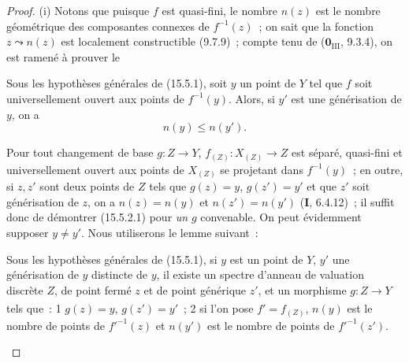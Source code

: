 \begin{proof}
(i) Notons que puisque $f$ est quasi-fini, le nombre $n(z)$ est le nombre géométrique des composantes connexes de $f^{-1}(z)$~; on sait que la fonction $z\leadsto n(z)$ est localement constructible (9.7.9)~; compte tenu de ($\mathbf{0}_{\mathrm{III}}$, 9.3.4), on est ramené à prouver le

\begin{corollary}[15.5.2]
Sous les hypothèses générales de \textup{(15.5.1)}, soit $y$ un point de $Y$ tel que $f$ soit universellement ouvert aux points de $f^{-1}(y)$. Alors, si $y'$ est une générisation de $y$, on a
\begin{equation}
\tag{15.5.2.1}
\label{IV.15.5.2.1-fr}
  n(y)\leqslant n(y').
\end{equation}
\end{corollary}

Pour tout changement de base $g:Z\to Y$, $f_{(Z)}:X_{(Z)}\to Z$ est séparé, quasi-fini et universellement ouvert aux points de $X_{(Z)}$ se projetant dans $f^{-1}(y)$~; en outre, si $z,z'$ sont deux points de $Z$ tels que $g(z)=y$, $g(z')=y'$ et que $z'$ soit générisation de $z$, on a $n(z)=n(y)$ et $n(z')=n(y')$ (\textbf{I}, 6.4.12)~; il suffit donc de démontrer (15.5.2.1) pour \emph{un} $g$ convenable. On peut évidemment supposer $y\ne y'$. Nous utiliserons le lemme suivant~:

\begin{lemma}[15.5.2.2]
\label{IV.15.5.2.2-fr}
Sous les hypothèses générales de \textup{(15.5.1)}, si $y$ est un point de $Y$, $y'$ une générisation de $y$ distincte de $y$, il existe un spectre d'anneau de valuation discrète $Z$, de point fermé $z$ et de point générique $z'$, et un morphisme $g:Z\to Y$ tels que~: \textup{1\textsuperscript{\textdegree}} $g(z)=y$, $g(z')=y'$~; \textup{2\textsuperscript{\textdegree}} si l'on pose $f'=f_{(Z)}$, $n(y)$ est le nombre de points de $f'^{-1}(z)$ et $n(y')$ est le nombre de points de $f'^{-1}(z')$.
\end{lemma}


\end{proof}
